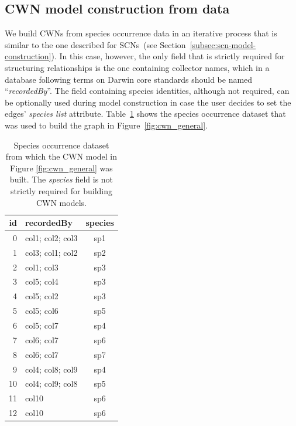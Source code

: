 {%
\subsection{CWN model construction from data} \label{section:cwn_construction_fromdata}

We build CWNs from species occurrence data in an iterative process that is similar to the one described for SCNs~(see Section~\ref{subsec:scn-model-construction}).
In this case, however, the only field that is strictly required for structuring relationships is the one containing collector names, which in a database following terms on Darwin core  standards should be named ``\textit{recordedBy}''.
The field containing species identities, although not required, can be optionally used during model construction in case the user decides to set the edges' \textit{species list} attribute.
Table~\ref{table:cwn_example_dataset} shows the species occurrence dataset that was used to build the graph in Figure~\ref{fig:cwn_general}.

\begin{table}[!ht]
  \caption[Species occurrence dataset from which the CWN model in Figure \ref{fig:cwn_general} was built]{Species occurrence dataset from which the CWN model in Figure \ref{fig:cwn_general} was built. The \textit{species} field is not strictly required for building CWN models.}
  \begin{center}
  \begin{tabular}{r l c}
      id & recordedBy & species \\
      \hline
        0 & col1; col2; col3 & sp1\\ 
        1 & col3; col1; col2 & sp2\\ 
        2 & col1; col3 & sp3\\ 
        3 & col5; col4 & sp3\\ 
        4 & col5; col2 & sp3\\ 
        5 & col5; col6 & sp5\\ 
        6 & col5; col7 & sp4\\ 
        7 & col6; col7 & sp6\\ 
        8 & col6; col7 & sp7\\ 
        9 & col4; col8; col9 & sp4\\ 
        10 & col4; col9; col8 & sp5\\ 
        11 & col10 & sp6\\ 
        12 & col10 & sp6\\
       \hline
  \end{tabular}
  \end{center}
  \label{table:cwn_example_dataset}
\end{table}

}
